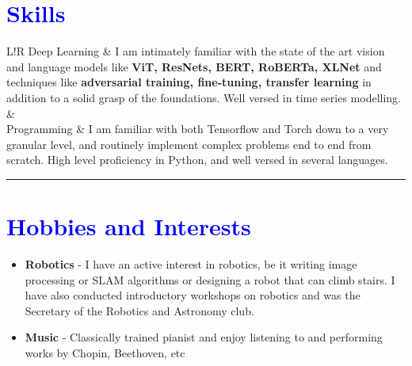 \documentclass[10pt]{article}
\newcommand\VRule{\color{blue}\vrule width 0.5pt}
\newcommand\bluetext[1]{\textcolor{blue}{#1}}
\newcommand\graytext[1]{\textcolor{lighttgray}{#1}}
\begin{document}
\section*{\bluetext{Skills}}
		\begin{tabular}{L!{\VRule}R}
			Deep Learning & \graytext{I am intimately familiar with the state of the art vision and language models like \textbf{ViT, ResNets, BERT, RoBERTa, XLNet} and techniques like \textbf{adversarial training, fine-tuning, transfer learning} in addition to a solid grasp of the foundations. Well versed in time series modelling.}\\
				&	\\
			Programming & \graytext{I am familiar with both Tensorflow and Torch down to a very granular level, and routinely implement complex problems end to end from scratch. High level proficiency in Python, and well versed in several languages.}\\

		\end{tabular}

\vspace{2em}
\hrule

\section*{\small\bluetext{Hobbies and Interests}}
	\graytext{	\begin{itemize}
		\item \textbf{Robotics} - I have an active interest in robotics, be it writing image processing or SLAM algorithms or designing a robot that can climb stairs. I have also conducted introductory workshops on robotics and was the Secretary of the Robotics and Astronomy club.
		\item \textbf{Music} - Classically trained pianist and enjoy listening to and performing works by Chopin, Beethoven, etc
	\end{itemize}}
	
\end{document}
